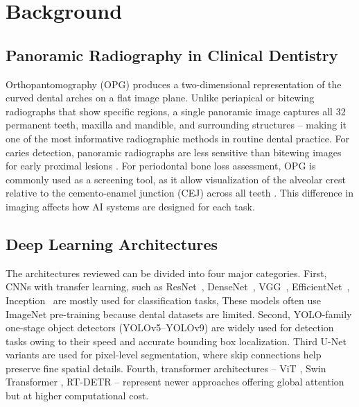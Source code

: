 \documentclass[conference]{IEEEtran}
\begin{document}
\section{Background}
\label{sec:background}

\subsection{Panoramic Radiography in Clinical Dentistry}

Orthopantomography (OPG) produces a two-dimensional representation of the curved dental arches on a flat image plane. Unlike periapical or bitewing radiographs that show specific regions, a single panoramic image captures all 32 permanent teeth, maxilla and mandible, and surrounding structures -- making it one of the most informative radiographic methods in routine dental practice. For caries detection, panoramic radiographs are less sensitive than bitewing images for early proximal lesions \cite{perez2024ai,bizjak2024advancing,pornprasertsuk2025clinical}.
For periodontal bone loss assessment, OPG is commonly used as a screening
tool, as it allow visualization of the alveolar crest relative to the
cemento-enamel junction (CEJ) across all teeth
\cite{jundaeng2025advanced,iacob2025automated,khubrani2025detection}.
This difference in imaging affects how AI systems are designed for each task.

\subsection{Deep Learning Architectures}

The architectures reviewed can be divided into four major categories. First,
CNNs with transfer learning, such as ResNet~\cite{khuwaja2024ai},
DenseNet~\cite{kaushik2025densenet201,ozdemir2026enhanced},
VGG~\cite{mathur2025comparative}, EfficientNet~\cite{chen2023deep},
Inception~\cite{gamal2025automated,zancan2025ai}  are mostly used for classification tasks, These models often use ImageNet pre-training because dental datasets are limited. Second, YOLO-family one-stage object
detectors (YOLOv5--YOLOv9)
\cite{ayhan2025detection,nassiri2025yolo,bizjak2024advancing,muresanu2024automating,pornprasertsuk2025clinical} are widely used for detection tasks owing to their speed and accurate bounding box localization. Third U-Net variants 
\cite{alharbi2023detection,asci2024deep,lim2024dual,kong2024integrating,zanini2024systematic}
are used for pixel-level segmentation, where skip connections help preserve fine spatial details. Fourth, transformer architectures -- ViT
\cite{bhoopalan2026self}, Swin Transformer
\cite{vannistelrooij2024combining,zhang2025reliable}, RT-DETR
\cite{karamuftuo2025panoramic} -- represent newer approaches offering global attention but at higher computational cost.
\end{document}
